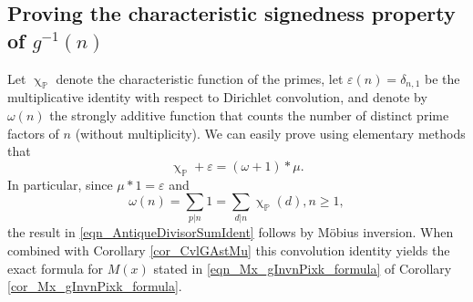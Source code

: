 \documentclass[11pt,reqno,a4letter]{article}
\numberwithin{figure}{section}
\numberwithin{table}{section}
\renewcommand{\chi}{\upchi}
\theoremstyle{plain}
\numberwithin{theorem}{section}
\theoremstyle{definition}
\begin{document}
\subsection{Proving the characteristic signedness property of $g^{-1}(n)$} 

Let $\chi_{\mathbb{P}}$ denote the characteristic function of the primes, let 
$\varepsilon(n) = \delta_{n,1}$ be the multiplicative identity with respect to Dirichlet convolution, 
and denote by $\omega(n)$ the strongly additive function that counts the number of 
distinct prime factors of $n$ (without multiplicity). We can easily prove using 
elementary methods that 
\begin{equation}
\label{eqn_AntiqueDivisorSumIdent} 
\chi_{\mathbb{P}} + \varepsilon = (\omega + 1) \ast \mu. 
\end{equation} 
In particular, since $\mu \ast 1 = \varepsilon$ and 
\[
\omega(n) = \sum_{p|n} 1 = \sum_{d|n} \chi_{\mathbb{P}}(d), n \geq 1, 
\]
the result in \eqref{eqn_AntiqueDivisorSumIdent} follows by M\"obius inversion. 
When combined with Corollary \ref{cor_CvlGAstMu} 
this convolution identity yields the exact 
formula for $M(x)$ stated in \eqref{eqn_Mx_gInvnPixk_formula} of 
Corollary \ref{cor_Mx_gInvnPixk_formula}. 
\end{document}
